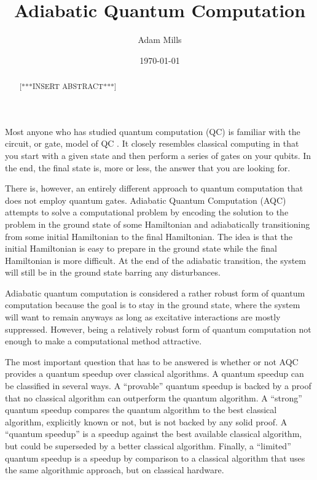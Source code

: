 \documentclass[%
 reprint,
 amsmath,amssymb,
 aps,
]{revtex4-1}
\begin{document}

\title{Adiabatic Quantum Computation}%

\author{Adam Mills}

\date{\today}%

\begin{abstract}
[***INSERT ABSTRACT***]
\end{abstract}

\maketitle



   Most anyone who has studied quantum computation (QC) is familiar with the circuit, or gate, model of QC \cite{Deutsch73}. It closely resembles classical computing in that you start with a given state and then perform a series of gates on your qubits. In the end, the final state is, more or less, the answer that you are looking for. 

   There is, however, an entirely different approach to quantum computation that does not employ quantum gates. Adiabatic Quantum Computation (AQC) attempts to solve a computational problem by encoding the solution to the problem in the ground state of some Hamiltonian and adiabatically transitioning from some initial Hamiltonian to the final Hamiltonian\cite{RevModPhys.90.015002}. The idea is that the initial Hamiltonian is easy to prepare in the ground state while the final Hamiltonian is more difficult. At the end of the adiabatic transition, the system will still be in the ground state barring any disturbances.
   
   Adiabatic quantum computation is considered a rather robust form of quantum computation because the goal is to stay in the ground state, where the system will want to remain anyways as long as excitative interactions are mostly suppressed. However, being a relatively robust form of quantum computation not enough to make a computational method attractive. 
   
   The most important question that has to be answered is whether or not AQC provides a quantum speedup over classical algorithms. A quantum speedup can be classified in several ways\cite{RevModPhys.90.015002}. A ``provable'' quantum speedup is backed by a proof that no classical algorithm can outperform the quantum algorithm. A ``strong'' quantum speedup compares the quantum algorithm to the best classical algorithm, explicitly known or not, but is not backed by any solid proof. A ``quantum speedup'' is a speedup against the best available classical algorithm, but could be superseded by a better classical algorithm. Finally, a ``limited'' quantum speedup is a speedup by comparison to a classical algorithm that uses the same algorithmic approach, but on classical hardware.
   
\end{document}
